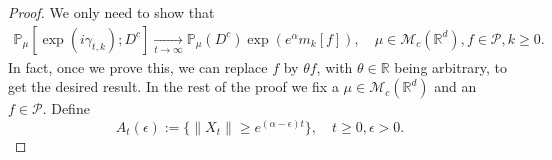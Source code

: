 \documentclass[12pt,a4paper]{amsart}
\theoremstyle{plain}
\theoremstyle{definition}
\numberwithin{equation}{section}
\begin{document}
 \begin{proof}
    We only need to show that
\begin{equation}\begin{split}
    \mathbb{P}_{\mu}[\exp(i\gamma_{t,k}); D^c]
    \xrightarrow[t\rightarrow \infty]{}\mathbb{P}_{\mu}(D^c)\exp(e^{\alpha}m_k[f]),
    \quad \mu \in \mathcal M_c(\mathbb R^d), f\in \mathcal P, k \geq 0.
\end{split}\end{equation}
    In fact, once we prove this, we can replace $f$ by $\theta f$, with $\theta \in \mathbb R$ being  arbitrary,  to get the desired result.
    In the rest of the proof we fix a $\mu \in \mathcal M_c(\mathbb R^d)$ and an $f\in \mathcal P$.
    Define
\[
    A_t(\epsilon):=\{ \|X_t\| \geq e^{(\alpha - \epsilon)t} \},\quad t\geq 0, \epsilon > 0.
\]


\end{proof}
\end{document}
